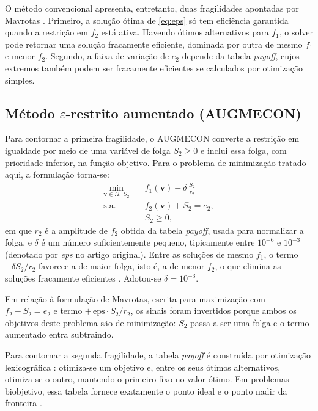 \documentclass[conference]{IEEEtran}
\begin{document}
O método convencional apresenta, entretanto, duas fragilidades apontadas por Mavrotas \cite{mavrotas2009}. Primeiro, a solução ótima de \eqref{eq:eps} só tem eficiência garantida quando a restrição em $f_2$ está ativa. Havendo ótimos alternativos para $f_1$, o solver pode retornar uma solução fracamente eficiente, dominada por outra de mesmo $f_1$ e menor $f_2$. Segundo, a faixa de variação de $e_2$ depende da tabela \textit{payoff}, cujos extremos também podem ser fracamente eficientes se calculados por otimização simples.

\subsection{Método $\varepsilon$-restrito aumentado (AUGMECON)}

Para contornar a primeira fragilidade, o AUGMECON \cite{mavrotas2009} converte a restrição em igualdade por meio de uma variável de folga $S_2 \ge 0$ e inclui essa folga, com prioridade inferior, na função objetivo. Para o problema de minimização tratado aqui, a formulação torna-se:
\begin{equation}
\begin{aligned}
\min_{\mathbf{v}\in\Omega,\ S_2} \quad & f_1(\mathbf{v}) - \delta\,\frac{S_2}{r_2}\\
\text{s.a.} \quad & f_2(\mathbf{v}) + S_2 = e_2,\\
& S_2 \ge 0,
\end{aligned}
\label{eq:aug}
\end{equation}
em que $r_2$ é a amplitude de $f_2$ obtida da tabela \textit{payoff}, usada para normalizar a folga, e $\delta$ é um número suficientemente pequeno, tipicamente entre $10^{-6}$ e $10^{-3}$ (denotado por \textit{eps} no artigo original). Entre as soluções de mesmo $f_1$, o termo $-\delta S_2/r_2$ favorece a de maior folga, isto é, a de menor $f_2$, o que elimina as soluções fracamente eficientes \cite{mavrotas2009}. Adotou-se $\delta = 10^{-3}$.

Em relação à formulação de Mavrotas, escrita para maximização com $f_2 - S_2 = e_2$ e termo $+\,\text{eps}\cdot S_2/r_2$, os sinais foram invertidos porque ambos os objetivos deste problema são de minimização: $S_2$ passa a ser uma folga e o termo aumentado entra subtraindo.

Para contornar a segunda fragilidade, a tabela \textit{payoff} é construída por otimização lexicográfica \cite{mavrotas2009}: otimiza-se um objetivo e, entre os seus ótimos alternativos, otimiza-se o outro, mantendo o primeiro fixo no valor ótimo. Em problemas biobjetivo, essa tabela fornece exatamente o ponto ideal e o ponto nadir da fronteira \cite{mavrotas2013}.
\end{document}
